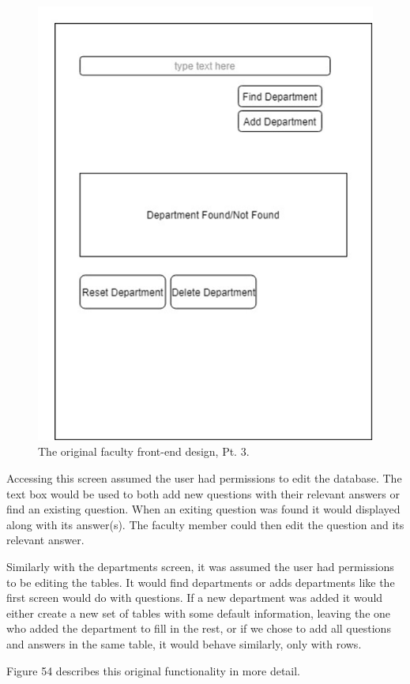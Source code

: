 \documentclass[titlepage, 12pt]{article}
\begin{document}
\begin{figure}[p]
    \centering\includegraphics[width=0.5\linewidth]{images/original-faculty-front-3.png}
    \caption{The original faculty front-end design, Pt. 3.}
\end{figure}

Accessing this screen assumed the user had permissions to edit the database. The text box would be used to both add new questions with their relevant answers or find an existing question. When an exiting question was found it would displayed along with its answer(s). The faculty member could then edit the question and its relevant answer. 

Similarly with the departments screen, it was assumed the user had permissions to be editing the tables. It would find departments or adds departments like the first screen would do with questions. If a new department was added it would either create a new set of tables with some default information, leaving the one who added the department to fill in the rest, or if we chose to add all questions and answers in the same table, it would behave similarly, only with rows.

Figure 54 describes this original functionality in more detail.
\end{document}
